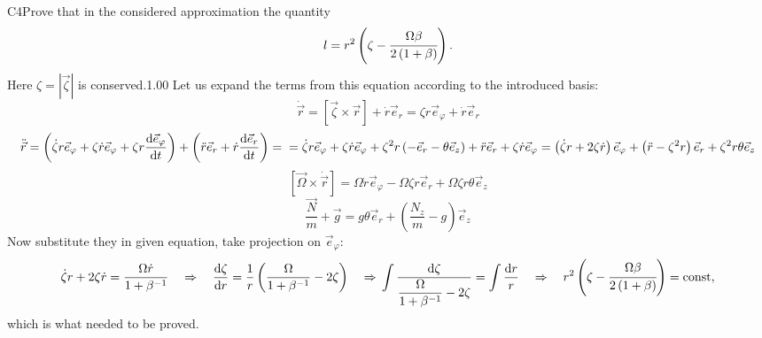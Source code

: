\documentclass[11pt,a4paper]{article}
\begin{document}
\begin{solcard}{C4}{Prove that in the considered approximation the quantity $$ l = r^2 \left( \zeta-\cfrac{\Omega\beta}{2\left(1+\beta\right)} \right). $$Here $\zeta = |\vec{\zeta}|$ is conserved.}{1.00}
Let us expand the terms from this equation according to the introduced basis: $$ \dot{\vec r} = \left[\vec \zeta \times \vec r\right] + \dot r \vec e_r = \zeta r \vec e_\varphi + \dot r \vec e_r $$ $$ \ddot{\vec r} = \left( \dot \zeta r \vec e_\varphi + \zeta \dot r \vec e_\varphi + \zeta r \frac{\text{d} \vec e_\varphi}{\text{d} t} \right) + \left( \ddot r \vec e_r + \dot r \frac{\text{d} \vec e_r}{\text{d} t} \right) =\\= \dot \zeta r \vec e_\varphi + \zeta \dot r \vec e_\varphi + \zeta^2 r \left(-\vec e_r - \theta \vec e_z\right) + \ddot r \vec e_r + \zeta \dot r \vec e_\varphi = \left(\dot \zeta r + 2 \zeta \dot r\right) \vec e_\varphi + \left(\ddot r - \zeta^2 r\right) \vec e_r + \zeta^2 r \theta \vec e_z $$ $$ \left[\vec \Omega \times \dot{\vec r}\right] = \Omega \dot r \vec e_\varphi - \Omega \zeta r \vec e_r + \Omega \zeta r \theta \vec e_z $$ $$ \frac{\vec N}{m} + \vec g = g \theta \vec e_r + \left( \frac{N_z}{m} - g \right) \vec e_z $$ Now substitute they in given equation, take projection on $\vec e_\varphi$: $$ \dot \zeta r + 2 \zeta \dot r = \frac{\Omega \dot r}{1 + \beta^{-1}} \quad \Rightarrow \quad \frac{\text d \zeta}{\text d r} = \frac{1}{r} \left( \frac{\Omega}{1 + \beta^{-1}} - 2 \zeta \right) \quad \Rightarrow\\ \int \frac{\text d \zeta}{\dfrac{\Omega}{1 + \beta^{-1}} - 2 \zeta} = \int \frac{\text d r}{r} \quad \Rightarrow \quad r^2 \left( \zeta-\cfrac{\Omega\beta}{2\left(1+\beta\right)} \right) = \text{const}, $$ which is what needed to be proved.



\end{solcard}
\end{document}

